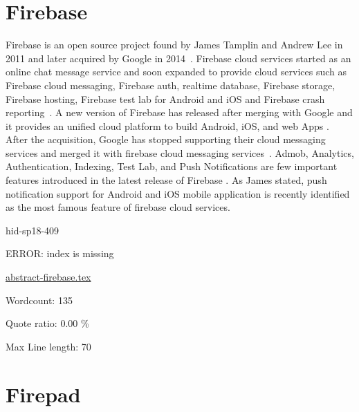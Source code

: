 \section{Firebase}

Firebase is an open source project found by James Tamplin and Andrew
Lee in 2011 and later acquired by Google in
2014~\cite{hid-sp18-409-www-firebase}. Firebase cloud services started
as an online chat message service and soon expanded to provide cloud
services such as Firebase cloud messaging, Firebase auth, realtime
database, Firebase storage, Firebase hosting, Firebase test lab for
Android and iOS and Firebase crash
reporting~\cite{hid-sp18-409-www-firebase-official}. A new version of
Firebase has released after merging with Google and it provides an
unified cloud platform to build Android, iOS, and web Apps
\cite{hid-sp18-409-www-firebase-official}. After the acquisition,
Google has stopped supporting their cloud messaging services and
merged it with firebase cloud messaging
services~\cite{hid-sp18-409-www-firebase-merged}. Admob, Analytics,
Authentication, Indexing, Test Lab, and Push Notifications are few
important features introduced in the latest release of Firebase
\cite{hid-sp18-409-www-firebase-official}. As James
\cite{hid-sp18-409-www-firebase} stated, push notification support for
Android and iOS mobile application is recently identified as the most
famous feature of firebase cloud services.


\begin{IU}

hid-sp18-409

ERROR: index is missing

\href{https://github.com/cloudmesh-community/hid-sp18-409/blob/master//technology/abstract-firebase.tex}{abstract-firebase.tex}

 

Wordcount: 135


Quote ratio: 0.00 \%
 
Max Line length: 70
\end{IU}

\section{Firepad}

